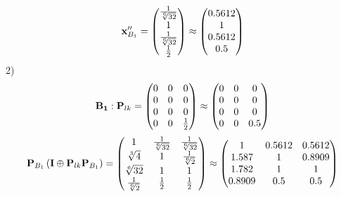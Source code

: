 \documentclass[10pt,a4paper]{article}
\begin{document}
	\[
		\bold{x}''_{B_1} = 
		\begin{pmatrix}
			\frac{1} {\sqrt[6]{32}} \\
			{1} {} \\
			\frac{1} {\sqrt[6]{32}} \\
			\frac{1} {{2}} \\
		\end{pmatrix}
		\approx
		\begin{pmatrix}
			0.5612   \\
			1        \\
			0.5612   \\
			0.5      \\
		\end{pmatrix}
	\]
	2)
	\[
		\bold{B_1}: \bold{P}_{lk} = 
		\begin{pmatrix}
			{{0}} {} & {{0}} {} & {{0}} {} \\
			{{0}} {} & {{0}} {} & {{0}} {} \\
			{{0}} {} & {{0}} {} & {{0}} {} \\
			{{0}} {} & {{0}} {} & \frac{1} {{2}} \\
		\end{pmatrix}
		\approx
		\begin{pmatrix}
			0        & 0        & 0        \\
			0        & 0        & 0        \\
			0        & 0        & 0        \\
			0        & 0        & 0.5      \\
		\end{pmatrix}
	\]
	\[
		\bold{P}_{B_1}\left(\bold{I} \oplus \bold{P}_{lk}\bold{P}_{B_1}\right) = 
		\begin{pmatrix}
			{1} {} & \frac{1} {\sqrt[6]{32}} & \frac{1} {\sqrt[6]{32}} \\
			{\sqrt[3]{4}} {} & {1} {} & \frac{1} {\sqrt[6]{2}} \\
			{\sqrt[6]{32}} {} & {1} {} & {1} {} \\
			\frac{1} {\sqrt[6]{2}} & \frac{1} {{2}} & \frac{1} {{2}} \\
		\end{pmatrix}
		\approx
		\begin{pmatrix}
			1        & 0.5612   & 0.5612   \\
			1.587    & 1        & 0.8909   \\
			1.782    & 1        & 1        \\
			0.8909   & 0.5      & 0.5      \\
		\end{pmatrix}
	\]
\end{document}
